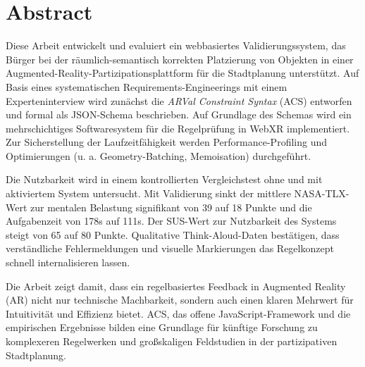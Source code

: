\section*{Abstract}\label{section:Abstract}

Diese Arbeit entwickelt und evaluiert ein webbasiertes Validierungssystem, das Bürger bei der räumlich-semantisch korrekten Platzierung von Objekten in einer Augmented-Reality-Partizipationsplattform für die Stadtplanung unterstützt. Auf Basis eines systematischen Requirements-Engineerings mit einem Experteninterview wird zunächst die \textit{ARVal Constraint Syntax} (ACS) entworfen und formal als JSON-Schema beschrieben. Auf Grundlage des Schemas wird ein mehrschichtiges Softwaresystem für die Regelprüfung in WebXR implementiert. Zur Sicherstellung der Laufzeitfähigkeit werden Performance-Profiling und Optimierungen (u. a. Geometry-Batching, Memoisation) durchgeführt.

Die Nutzbarkeit wird in einem kontrollierten Vergleichstest ohne und mit aktiviertem System untersucht. Mit Validierung sinkt der mittlere NASA-TLX-Wert zur mentalen Belastung signifikant von 39 auf 18 Punkte und die Aufgabenzeit von 178s auf 111s. Der SUS-Wert zur Nutzbarkeit des Systems steigt von 65 auf 80 Punkte. Qualitative Think-Aloud-Daten bestätigen, dass verständliche Fehlermeldungen und visuelle Markierungen das Regelkonzept schnell internalisieren lassen.

Die Arbeit zeigt damit, dass ein regelbasiertes Feedback in Augmented Reality (AR) nicht nur technische Machbarkeit, sondern auch einen klaren Mehrwert für Intuitivität und Effizienz bietet. ACS, das offene JavaScript-Framework und die empirischen Ergebnisse bilden eine Grundlage für künftige Forschung zu komplexeren Regelwerken und großskaligen Feldstudien in der partizipativen Stadtplanung.